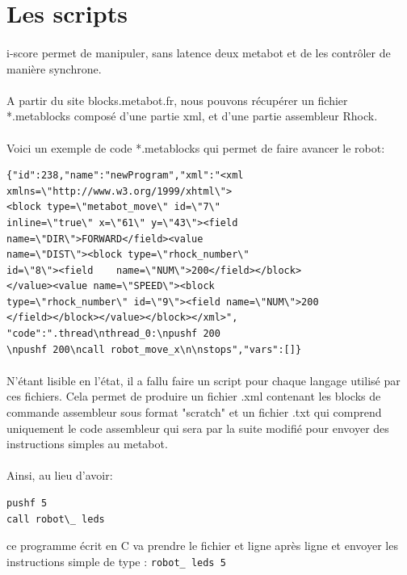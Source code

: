 \documentclass[10pt,a4paper]{report}
\begin{document}
\section{Les scripts}
\paragraph{}
i-score permet de manipuler, sans latence deux metabot et de les contrôler de manière synchrone.
\paragraph{}
A partir du site blocks.metabot.fr, nous pouvons récupérer un fichier *.metablocks composé d'une partie xml, et d'une partie assembleur Rhock.
\paragraph{}
Voici un exemple de code *.metablocks qui permet de faire avancer le robot:
\begin{verbatim}
{"id":238,"name":"newProgram","xml":"<xml
xmlns=\"http://www.w3.org/1999/xhtml\">
<block type=\"metabot_move\" id=\"7\"
inline=\"true\" x=\"61\" y=\"43\"><field
name=\"DIR\">FORWARD</field><value
name=\"DIST\"><block type=\"rhock_number\"
id=\"8\"><field    name=\"NUM\">200</field></block>
</value><value name=\"SPEED\"><block 
type=\"rhock_number\" id=\"9\"><field name=\"NUM\">200
</field></block></value></block></xml>",
"code":".thread\nthread_0:\npushf 200
\npushf 200\ncall robot_move_x\n\nstops","vars":[]}
\end{verbatim}
\paragraph{}
N'étant lisible en l'état, il a fallu faire un script pour chaque langage utilisé par ces fichiers. Cela permet de produire un fichier .xml contenant les blocks de commande assembleur sous format "scratch" et un fichier .txt qui comprend uniquement le code assembleur qui sera par la suite modifié pour envoyer des instructions simples au metabot.

\paragraph{}

Ainsi, au lieu d'avoir:
\begin{verbatim} 
pushf 5 
call robot\_ leds
\end{verbatim} 
ce programme écrit en C va prendre le fichier et ligne après ligne et envoyer les instructions simple de type : 
\texttt{robot\_ leds 5}
\end{document}
